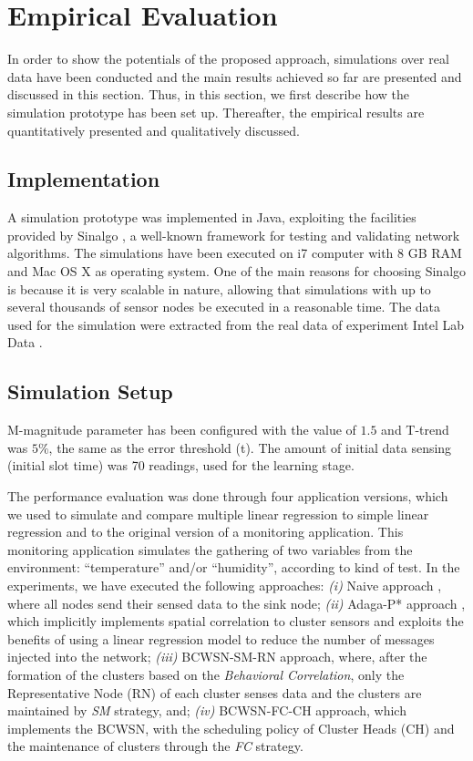 \documentclass{acm_proc_article-sp}
\begin{document}
\section{Empirical Evaluation}
\label{eval}

In order to show the potentials of the proposed approach, simulations over real
data have been conducted and the main results achieved so far are presented and
discussed in this section. Thus, in this section, we first describe how the
simulation prototype has been set up. Thereafter, the empirical results are
quantitatively presented and qualitatively discussed.

\subsection{Implementation}
\label{implementation}

A simulation prototype was implemented in Java, exploiting the facilities
provided by Sinalgo \cite{Sinalgo2007}, a well-known framework for testing and
validating network algorithms. The simulations have been executed on i7 computer
with 8 GB RAM and Mac OS X as operating system.
One of the main reasons for choosing Sinalgo is because it is very scalable in
nature, allowing that simulations with up to several thousands of sensor nodes
be executed in a reasonable time. The data used for the simulation were
extracted from the real data of experiment Intel Lab Data \cite{Intel2004}. 

\subsection{Simulation Setup}
\label{data-and-experiments}

M-magnitude parameter has been configured with the value of $1.5$ and T-trend
was $5\%$, the same as the error threshold (t). The amount of initial data sensing
(initial slot time) was 70 readings, used for the learning stage.

The performance evaluation was done through four application versions, which we
used to simulate and compare multiple linear regression to simple linear
regression and to the original version of a monitoring application. This
monitoring application simulates the gathering of two variables from the
environment: ``temperature'' and/or ``humidity'', according to kind of test.
In the experiments, we have executed the following approaches: {\it
  (i)} Naive approach \cite{Madden2005}, where all nodes send their sensed
data to the sink node;  {\it
  (ii)} Adaga-P* approach \cite{MaiaACR2013} \cite{MaiaSAC2013}, which
implicitly implements spatial correlation to cluster sensors and exploits the
benefits of using a linear regression model to reduce the number of messages
injected into the network;  {\it
  (iii)} BCWSN-SM-RN approach, where, after the formation of the clusters based on the
\textit{Behavioral Correlation}, only the Representative Node (RN) of each
cluster senses data and the clusters are maintained by \textit{SM}
strategy, and;  {\it 
  (iv)} BCWSN-FC-CH approach, which implements the BCWSN, with the scheduling
policy of Cluster Heads (CH) and the maintenance of clusters through the
\textit{FC} strategy.
\end{document}
